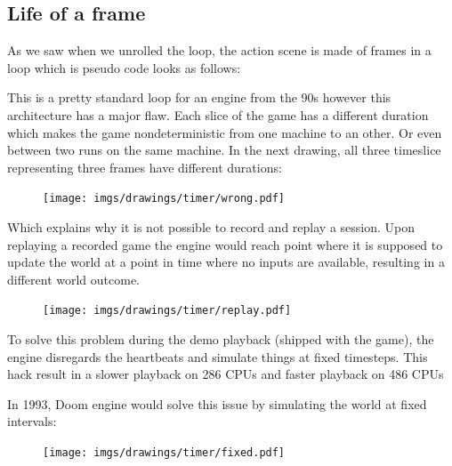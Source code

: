 \subsection{Life of a frame}
As we saw when we unrolled the loop, the action scene is made of frames in a loop which is pseudo code looks as follows:\\
\par
\begin{minipage}{\textwidth}
 
 \end{minipage}
\par
This is a pretty standard loop for an engine from the 90s however this architecture has a major flaw. Each slice of the game has a different duration which makes the game nondeterministic from one machine to an other. Or even between two runs on the same machine. In the next drawing, all three timeslice representing three frames have different durations:\\
\begin{figure}[H]
\centering
 \texttt{[image: imgs/drawings/timer/wrong.pdf]}
 
 \end{figure}
  Which explains why it is not possible to record and replay a session. Upon replaying a recorded game the engine would reach point where it is supposed to update the world at a point in time where no inputs are available, resulting in a different world outcome.\\
 \begin{figure}[H]
\centering
 \texttt{[image: imgs/drawings/timer/replay.pdf]}
 
 \end{figure}
\par
To solve this problem during the demo playback (shipped with the game), the engine disregards the heartbeats and simulate things at fixed timesteps. This hack result in a slower playback on 286 CPUs and faster playback on 486 CPUs\\
\par
{} In 1993, Doom engine would solve this issue by simulating the world at fixed intervals:\\
\par
\begin{minipage}{\textwidth}
 
 \end{minipage}
\par
 \begin{figure}[H]
\centering
 \texttt{[image: imgs/drawings/timer/fixed.pdf]}
 
 \end{figure}

